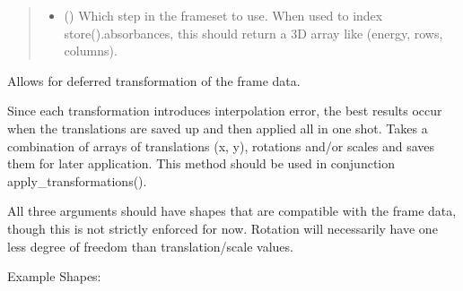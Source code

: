 \documentclass[letterpaper,10pt,english]{sphinxmanual}
\begin{document}
\begin{fulllineitems}
\begin{fulllineitems}
\begin{quote}
\begin{description}
\begin{itemize}
\item {} 
 (\sphinxstyleliteralemphasis{, }) \textendash{} Which step in the frameset to use. When used to index
store().absorbances, this should return a 3D array like
(energy, rows, columns).

\end{itemize}

\end{description}\end{quote}

\end{fulllineitems}


\begin{fulllineitems}
\label{\detokenize{xanespy:xanespy.xanes_frameset.XanesFrameset.stage_transformations}}
Allows for deferred transformation of the frame data.

Since each transformation introduces interpolation error, the
best results occur when the translations are saved up and then
applied all in one shot. Takes a combination of arrays of
translations (x, y), rotations and/or scales and saves them
for later application. This method should be used in
conjunction apply\_transformations().

All three arguments should have shapes that are compatible
with the frame data, though this is not strictly enforced for
now. Rotation will necessarily have one less degree of freedom
than translation/scale values.

Example Shapes:



\end{fulllineitems}
\end{fulllineitems}
\end{document}
